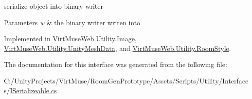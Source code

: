 serialize object into binary writer 


\begin{DoxyParams}{Parameters}
{\em w} & the binary writer writen into\\
\hline
\end{DoxyParams}


Implemented in \mbox{\hyperlink{class_virt_muse_web_1_1_utility_1_1_image_ae0ecd3ea4039b53bfe62c753b0669f2f}{Virt\+Muse\+Web.\+Utility.\+Image}}, \mbox{\hyperlink{class_virt_muse_web_1_1_utility_1_1_unity_mesh_data_ae1ccde7727b2551f950ce046499774f2}{Virt\+Muse\+Web.\+Utility.\+Unity\+Mesh\+Data}}, and \mbox{\hyperlink{class_virt_muse_web_1_1_utility_1_1_room_style_a01fa6d16e13112982a6f662367d0404e}{Virt\+Muse\+Web.\+Utility.\+Room\+Style}}.



The documentation for this interface was generated from the following file\+:\begin{DoxyCompactItemize}
\item 
C\+:/\+Unity\+Projects/\+Virt\+Muse/\+Room\+Gen\+Prototype/\+Assets/\+Scripts/\+Utility/\+Interfaces/\mbox{\hyperlink{_i_serializeable_8cs}{I\+Serializeable.\+cs}}\end{DoxyCompactItemize}
